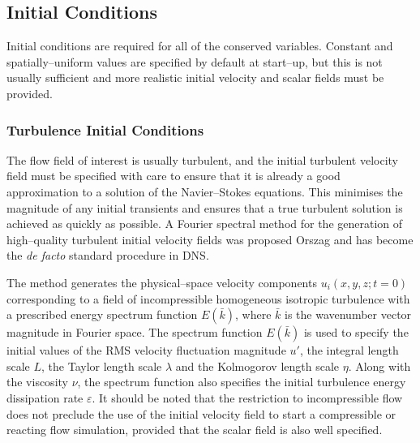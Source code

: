 \documentclass[dvips]{article}
\begin{document}
\subsection{Initial Conditions}
Initial conditions are required for all of the conserved variables.
Constant and spatially--uniform values are specified by default at
start--up, but this is not usually sufficient and more realistic initial
velocity and scalar fields must be provided.

\subsubsection{Turbulence Initial Conditions}
\label{TURBINIT}
The flow field of interest is usually turbulent, and the initial turbulent
velocity field must be specified with care to ensure that it is already
a good approximation to a solution of the Navier--Stokes equations.
This minimises the magnitude of any initial transients and ensures that
a true turbulent solution is achieved as quickly as possible.  A
Fourier spectral method for the generation of high--quality turbulent initial
velocity fields was proposed Orszag \cite{Orszag} and has become the
{\it de facto} standard procedure in DNS.

The method generates the physical--space velocity components
$u_{i}(x,y,z; t=0)$ corresponding to a field of incompressible homogeneous
isotropic turbulence with a prescribed energy spectrum function $E(\bar{k})$,
where $\bar{k}$ is the wavenumber vector magnitude in Fourier space.
The spectrum function $E(\bar{k})$ is used to specify the initial values
of the RMS velocity fluctuation magnitude $u'$, the integral length scale $L$,
the Taylor length scale $\lambda$ and the Kolmogorov length scale
$\eta$.  Along with the viscosity $\nu$, the spectrum function also
specifies the initial turbulence energy dissipation rate $\varepsilon$.
It should be noted that the restriction to incompressible flow does
not preclude the use of the initial velocity field to start a compressible or
reacting flow simulation, provided that the scalar field is also well
specified.
\end{document}
